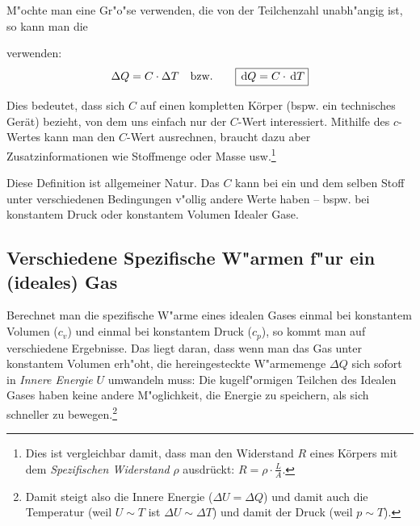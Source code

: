 M"ochte man eine Gr"o"se verwenden, die von der Teilchenzahl unabh"angig
ist, so kann man die
\begin{Def}
   verwenden:
   \begin{equation}
      \label{eqn_waermekapazitaet}
      \Delta Q = C \cdot \Delta T \text{ ~ bzw. ~ ~ } 
\boxed{\, \mathrm{d} Q = C \cdot \, \mathrm{d} T}
   \end{equation}
\end{Def}

Dies bedeutet, dass sich $C$ auf einen kompletten Körper (bspw. ein
technisches Gerät) bezieht, von dem uns einfach nur der $C$-Wert
interessiert. Mithilfe des $c$-Wertes kann man den $C$-Wert
ausrechnen, braucht dazu aber Zusatzinformationen wie Stoffmenge oder
Masse usw.\footnote{Dies ist vergleichbar damit, dass man den
  Widerstand $R$ eines Körpers mit dem \emph{Spezifischen Widerstand}
  $\rho$ ausdrückt: $R = \rho \cdot \frac{L}{A}$.}

Diese Definition ist allgemeiner Natur. Das $C$ kann bei ein und dem
selben Stoff unter verschiedenen Bedingungen v"ollig andere Werte haben
-- bspw. bei konstantem Druck oder konstantem Volumen Idealer Gase.






\subsection{Verschiedene Spezifische W"armen f"ur ein (ideales) Gas}
\label{kap_spezifische-warme-fur-ein-ideales-gas}



Berechnet man die spezifische W"arme eines idealen Gases einmal bei
konstantem Volumen ($c_v$) und einmal bei konstantem Druck ($c_p$), so
kommt man auf verschiedene Ergebnisse. Das liegt daran, dass wenn man
das Gas unter konstantem Volumen erh"oht, die hereingesteckte
W"armemenge $\Delta Q$ sich sofort in \emph{Innere Energie} $U$
umwandeln muss: Die kugelf"ormigen Teilchen des Idealen Gases haben
keine andere M"oglichkeit, die Energie zu speichern, als sich schneller
zu bewegen.\footnote{Damit steigt also die Innere Energie ($\Delta U =
  \Delta Q$) und damit auch die Temperatur (weil $U \sim T$ ist
  $\Delta U \sim \Delta T$) und damit der Druck (weil $p \sim T$).}

